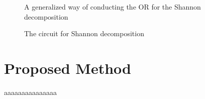 \begin{figure}[bpt]
  \begin{minipage}{0.46\linewidth}
    \begin{center}
      \scalebox{0.7} {
        
      }
    \end{center}
    \caption{Generalization of Fig.~ref{fig-urtof}, which also implements the Boolean product of two functions}
    \label{fig-f-dot-g}
  \end{minipage}
  \begin{minipage}{0.46\linewidth}
    \begin{center}
      \scalebox{0.9} {
        
      }
      \caption{A generalized way of conducting the OR for the Shannon decomposition}
      \label{fig-bool-or}
    \end{center}
  \end{minipage}
\end{figure}
\begin{figure}[t]
  \begin{minipage}{\linewidth}
    \begin{center}
      \scalebox{0.8} {
        
      }
    \end{center}
    \caption{The circuit for Shannon decomposition}
    \label{fig-shannon}
  \end{minipage}
\vspace*{0.5cm}
\end{figure}

  
\section{Proposed Method}
aaaaaaaaaaaaaaa
\label{Sec:proposed}
